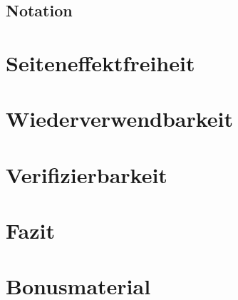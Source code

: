 \documentclass{beamer}
\begin{document}
\subsection{Notation}

\section{Seiteneffektfreiheit}
\section{Wiederverwendbarkeit}
\section{Verifizierbarkeit}
\section{Fazit}
\section{Bonusmaterial}
\end{document}
